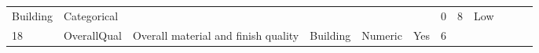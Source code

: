 \documentclass[11pt]{article}
\begin{document}
\begin{longtable}[]{@{}llllllllllll@{}}
\begin{minipage}[t]{0.04\columnwidth}
Building\strut
\end{minipage} & \begin{minipage}[t]{0.04\columnwidth}\raggedright\strut
Categorical\strut
\end{minipage} & \begin{minipage}[t]{0.04\columnwidth}\raggedright\strut
\strut
\end{minipage} & \begin{minipage}[t]{0.04\columnwidth}\raggedright\strut
\strut
\end{minipage} & \begin{minipage}[t]{0.04\columnwidth}\raggedright\strut
\strut
\end{minipage} & \begin{minipage}[t]{0.04\columnwidth}\raggedright\strut
\strut
\end{minipage} & \begin{minipage}[t]{0.04\columnwidth}\raggedright\strut
0\strut
\end{minipage} & \begin{minipage}[t]{0.04\columnwidth}\raggedright\strut
8\strut
\end{minipage} & \begin{minipage}[t]{0.04\columnwidth}\raggedright\strut
Low\strut
\end{minipage}\tabularnewline
\begin{minipage}[t]{0.04\columnwidth}\raggedright\strut
18\strut
\end{minipage} & \begin{minipage}[t]{0.04\columnwidth}\raggedright\strut
OverallQual\strut
\end{minipage} & \begin{minipage}[t]{0.04\columnwidth}\raggedright\strut
Overall material and finish quality\strut
\end{minipage} & \begin{minipage}[t]{0.04\columnwidth}\raggedright\strut
Building\strut
\end{minipage} & \begin{minipage}[t]{0.04\columnwidth}\raggedright\strut
Numeric\strut
\end{minipage} & \begin{minipage}[t]{0.04\columnwidth}\raggedright\strut
Yes\strut
\end{minipage} & \begin{minipage}[t]{0.04\columnwidth}\raggedright\strut
6\strut
\end{minipage} & \begin{minipage}[t]{0.04\columnwidth}\raggedright\strut

\end{minipage}
\end{longtable}
\end{document}
